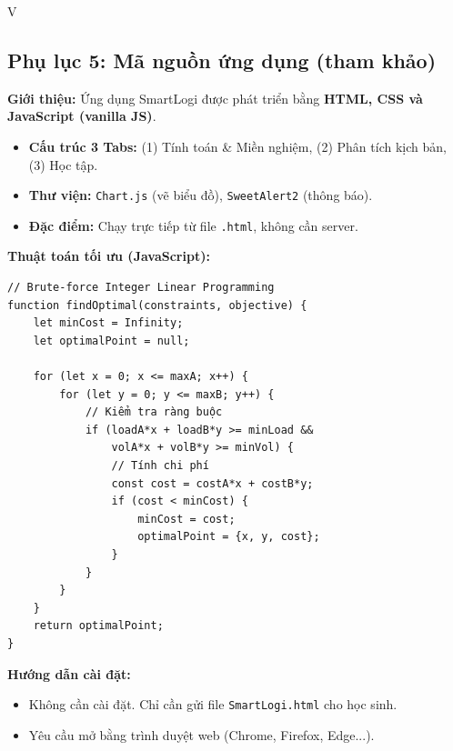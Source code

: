 \documentclass[12pt,a4paper]{article}
\begin{document}
\begin{competitionsection}{V}
\subsection*{Phụ lục 5: Mã nguồn ứng dụng (tham khảo)}
\textbf{Giới thiệu:} Ứng dụng SmartLogi được phát triển bằng \textbf{HTML, CSS và JavaScript (vanilla JS)}.
\begin{itemize}[leftmargin=*,noitemsep]
\item \textbf{Cấu trúc 3 Tabs:} (1) Tính toán \& Miền nghiệm, (2) Phân tích kịch bản, (3) Học tập.
\item \textbf{Thư viện:} \texttt{Chart.js} (vẽ biểu đồ), \texttt{SweetAlert2} (thông báo).
\item \textbf{Đặc điểm:} Chạy trực tiếp từ file \texttt{.html}, không cần server.
\end{itemize}

\textbf{Thuật toán tối ưu (JavaScript):}
\begin{verbatim}
// Brute-force Integer Linear Programming
function findOptimal(constraints, objective) {
    let minCost = Infinity;
    let optimalPoint = null;
    
    for (let x = 0; x <= maxA; x++) {
        for (let y = 0; y <= maxB; y++) {
            // Kiểm tra ràng buộc
            if (loadA*x + loadB*y >= minLoad &&
                volA*x + volB*y >= minVol) {
                // Tính chi phí
                const cost = costA*x + costB*y;
                if (cost < minCost) {
                    minCost = cost;
                    optimalPoint = {x, y, cost};
                }
            }
        }
    }
    return optimalPoint;
}
\end{verbatim}

\textbf{Hướng dẫn cài đặt:}
\begin{itemize}[leftmargin=*,noitemsep]
\item Không cần cài đặt. Chỉ cần gửi file \texttt{SmartLogi.html} cho học sinh.
\item Yêu cầu mở bằng trình duyệt web (Chrome, Firefox, Edge...).
\end{itemize}
\end{competitionsection}
\end{document}
